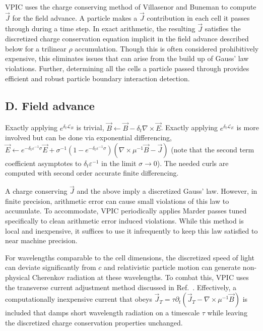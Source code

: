 \documentclass[letter,10pt]{article}
\newcommand{\eps}{\varepsilon}
\newcommand{\vecJ}{\vec{J}}
\newcommand{\vecE}{\vec{E}}
\newcommand{\vecB}{\vec{B}}
\newcommand{\op}{\mathcal{L}}
\newcommand{\PDeriv}[2]{\partial_{#2}#1}
\newcommand{\Curl}[1]{\nabla \times #1}
\begin{document}
VPIC uses the charge conserving method of Villasenor and Buneman
\cite{Villasenor_Buneman_1992} to compute $\vecJ$ for the
field advance.  A particle makes a $\vecJ$ contribution in each cell
it passes through during a time step.  In exact arithmetic, the
resulting $\vecJ$ satisfies the discretized charge conservation
equation implicit in the field advance described below for a trilinear
$\rho$ accumulation.  Though this is often considered prohibitively
expensive, this eliminates issues that can arise from the build up of
Gauss' law violations.  Further, determining all the cells a particle
passed through provides efficient and robust particle boundary
interaction detection.

\subsection{D. Field advance}

Exactly applying $e^{\delta_t \op_B}$ is trivial, $\vecB \leftarrow
\vecB - \delta_t \Curl{\vecE}$.  Exactly applying
$e^{\delta_t \op_E}$ is more involved but can be done via
exponential differencing, $\vecE \leftarrow e^{-\delta_t \eps^{-1}
\sigma} \vecE +
\sigma^{-1}\left( 1 - e^{-\delta_t \eps^{-1} \sigma} \right)
\left( \Curl{\mu^{-1}\vecB} - \vecJ \right)$ (note that the second
term coefficient asymptotes to $\delta_t \eps^{-1}$ in the limit
$\sigma \rightarrow 0$).  The needed curls are computed with second
order accurate finite differencing.

A charge conserving $\vecJ$ and the above imply a discretized Gauss'
law.  However, in finite precision, arithmetic error can cause small
violations of this law to accumulate.  To accommodate, VPIC
periodically applies Marder passes \cite{Marder_1987} tuned
specifically to clean arithmetic error induced violations.  While this
method is local and inexpensive, it suffices to use it infrequently to
keep this law satisfied to near machine precision.

For wavelengths comparable to the cell dimensions, the discretized
speed of light can deviate significantly from $c$ and relativistic
particle motion can generate non-physical Cherenkov radiation at these
wavelengths.  To combat this, VPIC uses the transverse current
adjustment method discussed in Ref.~\cite{Eastwood_et_al_1995}.
Effectively, a computationally inexpensive current that obeys $\vecJ_T
= \tau \PDeriv{\left(\vecJ_T - \Curl{\mu^{-1}\vecB}\right)}{t}$ is
included that damps short wavelength radiation on a timescale $\tau$
while leaving the discretized charge conservation properties unchanged.
\end{document}
